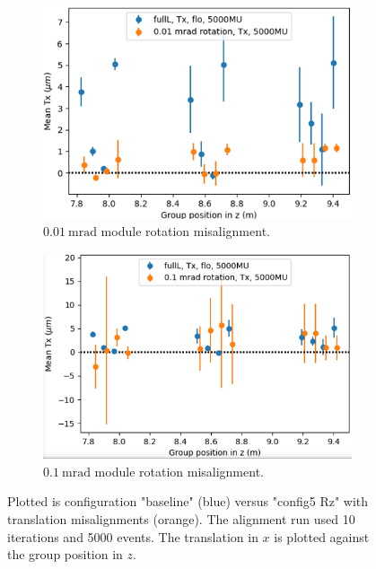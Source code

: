 \begin{figure}
  \centering
  \begin{subfigure}[b]{0.4\textwidth}
    \centering
    \includegraphics[width=\textwidth]{plots/misalign_rota/001_rot_Tx.png}
    \caption{$\SI{0.01}{\milli\radian}$ module rotation misalignment.}
    \label{fig:001Tx}
  \end{subfigure}
  \hfill
  \begin{subfigure}[b]{0.4\textwidth}
    \centering
    \includegraphics[width=\textwidth]{plots/misalign_rota/01_rot_Tx.png}
    \caption{$\SI{0.1}{\milli\radian}$ module rotation misalignment.}
    \label{fig:01Tx}
  \end{subfigure}
  \caption{Plotted is configuration "baseline" (blue) versus "config5 Rz" with translation misalignments (orange). The alignment run used 10 iterations and 5000 events. The translation in $x$ is plotted against the group position in $z$.}
  \label{fig:mis_rot_Tx}
\end{figure}

